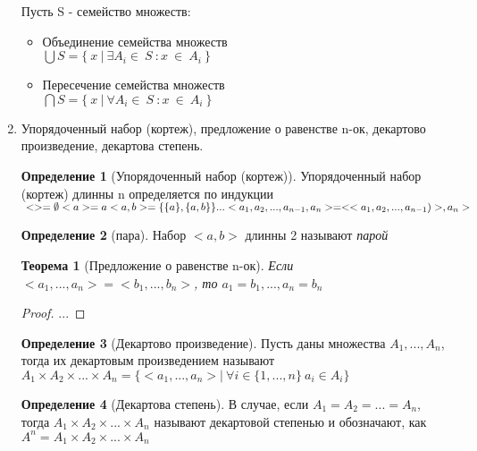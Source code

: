 \documentclass{article}
\newtheorem*{theorem*}{Теорема}
\theoremstyle{definition}
\newtheorem*{definition*}{Определение}
\begin{document}
\begin{enumerate}
\begin{itemize}
      \end{itemize}\newpage
      Пусть S - семейство множеств:
      \begin{itemize}
        \item Объединение семейства множеств\\
        $\bigcup{S} = \{\ x\ |\ \exists{A_i} \in{\ S \ }:x\ \in{\ A_i \ }\}$
        \item Пересечение семейства множеств\\
        $\bigcap{S} = \{\ x\ |\ \forall{A_i} \in{\ S\ }: x\ \in{\ A_i \ } \}$
      \end{itemize}
    \item Упорядоченный набор (кортеж), предложение о равенстве n-ок, декартово произведение, декартова степень.
    \begin{definition*}[Упорядоченный набор (кортеж)]
      Упорядоченный набор (кортеж) длинны n определяется по индукции
      \begin{math}\\
        <> = \emptyset\\
        <a> = a\\
        <a,b> = \{\{a\},\{a,b\}\}
        \\
        ...
        \\
        <a_1, a_2, ...,a_{n-1} ,a_n> = <<a_1, a_2, ...,a_{n-1})>, a_n>
      \end{math}
    \end{definition*}
    \begin{definition*}[пара]
        Набор $<a,b>$ длинны 2 называют \textit{парой}
    \end{definition*}
    \begin{theorem*}[Предложение о равенстве n-ок]
      Если \mbox{$<a_1,...,a_n> = <b_1, ..., b_n>$}, то $a_1 = b_1, ..., a_n = b_n$
    \end{theorem*}
    \begin{proof}
        ...
    \end{proof}
    \begin{definition*}[Декартово произведение]
      Пусть даны множества $A_1,...,A_n$, тогда их декартовым произведением называют
      \newline\mbox{$A_1 \times A_2 \times ... \times A_n = \{<a_1,...,a_n>|\  \forall{i}\in{\{1,...,n\}}\ a_i\in{A_i} \}$}
    \end{definition*}
    \begin{definition*}[Декартова степень]
      В случае, если \mbox{$A_1=A_2=...=A_n$}, тогда $A_1 \times A_2 \times ... \times A_n$ называют декартовой степенью и обозначают, как $A^n=A_1 \times A_2 \times ... \times A_n$
    \end{definition*}
    
  \end{enumerate}
\end{document}
